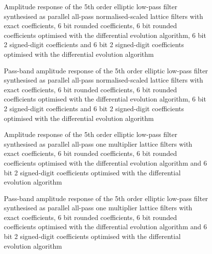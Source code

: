 \documentclass[a4paper,twoside,10pt,english]{report}
\begin{document}
\begin{figure}[!htbp]
\begin{center}
\scalebox{0.7}{}
\caption{Amplitude response of the 5th order elliptic low-pass filter 
synthesised as parallel all-pass normalised-scaled lattice filters with exact
coefficients, 6 bit rounded coefficients, 6 bit rounded coefficients
optimised with the differential evolution algorithm, 6 bit 2 signed-digit
coefficients and 6 bit 2 signed-digit coefficients optimised with the 
differential evolution algorithm}
\label{fig:de_min_NSPA_lattice_response}
\end{center}
\end{figure}
\begin{figure}[!htbp]
\begin{center}
\scalebox{0.7}{}
\caption{Pass-band amplitude response of the 5th order elliptic low-pass filter
synthesised as parallel all-pass normalised-scaled lattice filters with exact
coefficients, 6 bit rounded coefficients, 6 bit rounded coefficients
optimised with the differential evolution algorithm, 6 bit 2 signed-digit
coefficients and 6 bit 2 signed-digit coefficients optimised with the
differential evolution algorithm}
\label{fig:de_min_NSPA_lattice_passband_response}
\end{center}
\end{figure}
\begin{figure}[!htbp]
\begin{center}
\scalebox{0.7}{}
\caption{Amplitude response of the 5th order elliptic low-pass filter 
synthesised as parallel all-pass one multiplier lattice filters with exact
coefficients, 6 bit rounded coefficients, 6 bit rounded coefficients
optimised with the differential evolution algorithm and 6 bit 2 signed-digit 
coefficients optimised with the differential evolution algorithm}
\label{fig:de_min_OneMPA_lattice_response}
\end{center}
\end{figure}
\begin{figure}[!htbp]
\begin{center}
\scalebox{0.7}{}
\caption{Pass-band amplitude response of the 5th order elliptic low-pass filter
synthesised as parallel all-pass one multiplier lattice filters with exact
coefficients, 6 bit rounded coefficients, 6 bit rounded coefficients
optimised with the differential evolution algorithm and 6 bit 2 signed-digit 
coefficients optimised with the differential evolution algorithm}
\label{fig:de_min_OneMPA_lattice_passband_response}
\end{center}
\end{figure}
\end{document}
